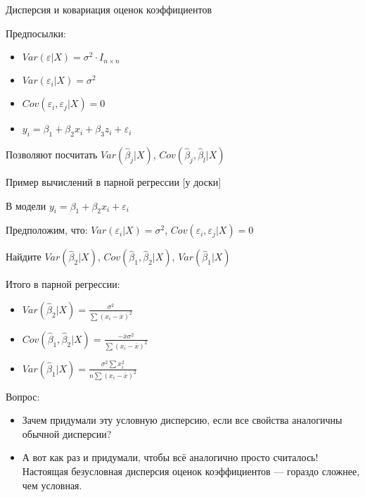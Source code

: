 \documentclass[ignorenonframetext,]{beamer}
\newcommand{\e}{\varepsilon}
\begin{document}
\begin{frame}{Дисперсия и ковариация оценок коэффициентов}

Предпосылки:

\begin{itemize}
\itemsep1pt\parskip0pt
\item
  \(Var(\varepsilon|X)=\sigma^2 \cdot I_{n\times n}\)
\item
  \(Var(\varepsilon_i|X)=\sigma^2\)
\item
  \(Cov(\varepsilon_i,\varepsilon_j|X)=0\)
\item
  \(y_i=\beta_1 + \beta_2 x_i + \beta_3 z_i +\varepsilon_i\)
\end{itemize}

Позволяют посчитать \(Var(\hat{\beta}_j|X)\),
\(Cov(\hat{\beta}_j,\hat{\beta}_l|X)\)

\end{frame}

\begin{frame}{Пример вычислений в парной регрессии {[}у доски{]}}

В модели \(y_i=\beta_1 + \beta_2 x_i + \varepsilon_i\)

Предположим, что: \(Var(\varepsilon_i|X)=\sigma^2\),
\(Cov(\varepsilon_i, \e_j|X)=0\)

Найдите \(Var(\hat{\beta}_2|X)\),
\(Cov(\hat{\beta}_1,\hat{\beta}_2 |X)\), \(Var(\hat{\beta}_1|X)\)

\end{frame}

\begin{frame}{Итого в парной регрессии:}

\begin{itemize}
\item
  \(Var(\hat{\beta}_2|X)=\frac{\sigma^2}{\sum (x_i-\bar{x})^2}\)
\item
  \(Cov(\hat{\beta}_1,\hat{\beta}_2 |X)=\frac{-\bar{x}\sigma^2}{\sum (x_i-\bar{x})^2}\)
\item
  \(Var(\hat{\beta}_1|X)=\frac{\sigma^2 \sum x_i^2}{n\sum (x_i-\bar{x})^2}\)
\end{itemize}

\end{frame}

\begin{frame}{Вопрос:}

\begin{itemize}
\item
  Зачем придумали эту условную дисперсию, если все свойства аналогичны
  обычной дисперсии?
\item
  А вот как раз и придумали, чтобы всё аналогично просто считалось!
  Настоящая безусловная дисперсия оценок коэффициентов --- гораздо
  сложнее, чем условная.
\end{itemize}

\end{frame}
\end{document}
